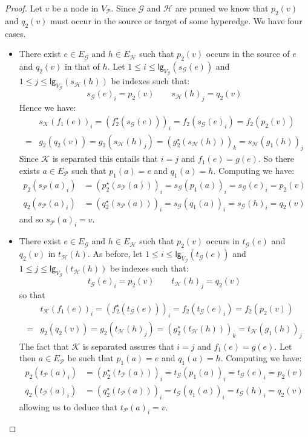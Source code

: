 \documentclass[3p]{elsarticle}
\newcommand{\lgh}{\mathsf{lg}}
\theoremstyle{remark}
\theoremstyle{definition}
\begin{document}
\begin{proof}
	Let $v$ be a node in $V_{\mathcal{P}}$. Since $\mathcal{G}$ and $\mathcal{H}$ are pruned we know that $p_2(v)$ and $q_2(v)$ must occur in the source or target of some hyperedge. We have four cases.
	\begin{itemize}
		\item There exist $e\in E_{\mathcal{G}}$ and $h\in E_{\mathcal{H}}$ such that $p_2(v)$ occurs in the source of $e$ and $q_2(v)$ in  that of $h$. Let $1\leq i\leq \lgh_{V_{\mathcal{G}}}(s_{\mathcal{G}}(e))$ and $1\leq j\leq \lgh_{V_{\mathcal{G}}}(s_{\mathcal{H}}(h))$ be indexes such that:
		\[s_{\mathcal{G}}(e)_i = p_2(v) \qquad s_{\mathcal{H}}(h)_j = q_2(v)\]
		Hence we have:
		\begin{align*}
		&s_{\mathcal{K}}(f_1(e))_i=(f^\star_2(s_{\mathcal{G}}(e)))_i=f_2(s_{\mathcal{G}}(e)_i)=f_2(p_2(v))\\=&g_2(q_2(v))=g_2(s_{\mathcal{H}}(h)_j)=(g^\star_2(s_{\mathcal{H}}(h)))_k=s_{\mathcal{H}}(g_1(h))_j
		\end{align*}
	Since $\mathcal{K}$ is separated this entails that $i = j$ and  $f_1(e)=g(e)$. So there exists $a\in E_{\mathcal{P}}$ such that $p_1(a)=e$
 and $q_1(a)=h$. Computing we have:
 \begin{align*}
 	p_2(s_{\mathcal{P}}(a)_i)&=(p^\star_2(s_{\mathcal{P}}(a)))_i=s_{\mathcal{G}}(p_1(a))_i=s_{\mathcal{G}}(e)_i = p_2(v)\\
 	q_2(s_{\mathcal{P}}(a)_i)&=(q^\star_2(s_{\mathcal{P}}(a)))_i=s_{\mathcal{G}}(q_1(a))_i=s_{\mathcal{G}}(h)_i = q_2(v)
 \end{align*}
 and so $s_{\mathcal{P}}(a)_i=v$.
 		\item 	There exist $e\in E_{\mathcal{G}}$ and $h\in E_{\mathcal{H}}$ such that $p_2(v)$ occurs in $t_{\mathcal{G}}(e)$ and $q_2(v)$ in $t_{\mathcal{H}}(h)$. As before, let $1\leq i\leq \lgh_{V_{\mathcal{G}}}(t_{\mathcal{G}}(e))$ and $1\leq j\leq \lgh_{V_{\mathcal{G}}}(t_{\mathcal{H}}(h))$ be indexes such that:
 		\[t_{\mathcal{G}}(e)_i = p_2(v) \qquad t_{\mathcal{H}}(h)_j = q_2(v)\]
 		so that
 		\begin{align*}
 			&t_{\mathcal{K}}(f_1(e))_i=(f^\star_2(t_{\mathcal{G}}(e)))_i=f_2(t_{\mathcal{G}}(e)_i)=f_2(p_2(v))\\=&g_2(q_2(v))=g_2(t_{\mathcal{H}}(h)_j)=(g^\star_2(t_{\mathcal{H}}(h)))_k=t_{\mathcal{H}}(g_1(h))_j
 		\end{align*}
 		The fact that $\mathcal{K}$ is separated assures that $i = j$ and  $f_1(e)=g(e)$. Let then $a\in E_{\mathcal{P}}$ be such that $p_1(a)=e$
 		and $q_1(a)=h$. Computing we have:
 		\begin{align*}
 			p_2(t_{\mathcal{P}}(a)_i)&=(p^\star_2(t_{\mathcal{P}}(a)))_i=t_{\mathcal{G}}(p_1(a))_i=t_{\mathcal{G}}(e)_i = p_2(v)\\
 			q_2(t_{\mathcal{P}}(a)_i)&=(q^\star_2(t_{\mathcal{P}}(a)))_i=t_{\mathcal{G}}(q_1(a))_i=t_{\mathcal{G}}(h)_i = q_2(v)
 		\end{align*}
 		allowing us to deduce that $t_{\mathcal{P}}(a)_i=v$.
 		

\end{itemize}
\end{proof}
\end{document}

